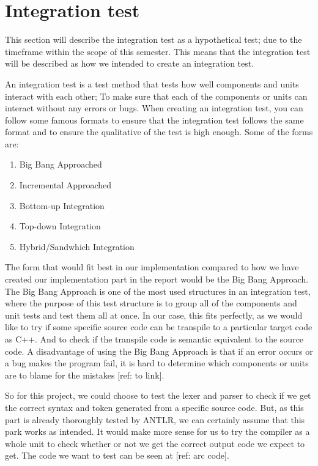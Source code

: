 \section{Integration test}\label{subsec:integrationtest}


This section will describe the integration test as a hypothetical test; due to the timeframe within the scope of this semester. This means that the integration test will be described as how we intended to create an integration test.

An integration test is a test method that tests how well components and units interact with each other; To make sure that each of the components or units can interact without any errors or bugs. When creating an integration test, you can follow some famous formats to ensure that the integration test follows the same format and to ensure the qualitative of the test is high enough. Some of the forms are:

\begin{enumerate}
    \item Big Bang Approached
    \item Incremental Approached
    \item Bottom-up Integration
    \item Top-down Integration
    \item Hybrid/Sandwhich Integration
\end{enumerate}

The form that would fit best in our implementation compared to how we have created our implementation part in the report would be the Big Bang Approach. The Big Bang Approach is one of the most used structures in an integration test, where the purpose of this test structure is to group all of the components and unit tests and test them all at once. In our case, this fits perfectly, as we would like to try if some specific source code can be transpile to a particular target code as C++. And to check if the transpile code is semantic equivalent to the source code. A disadvantage of using the Big Bang Approach is that if an error occurs or a bug makes the program fail, it is hard to determine which components or units are to blame for the mistakes [ref: to link].

So for this project, we could choose to test the lexer and parser to check if we get the correct syntax and token generated from a specific source code. But, as this part is already thoroughly tested by ANTLR, we can certainly assume that this park works as intended. It would make more sense for us to try the compiler as a whole unit to check whether or not we get the correct output code we expect to get. The code we want to test can be seen at [ref: arc code].

